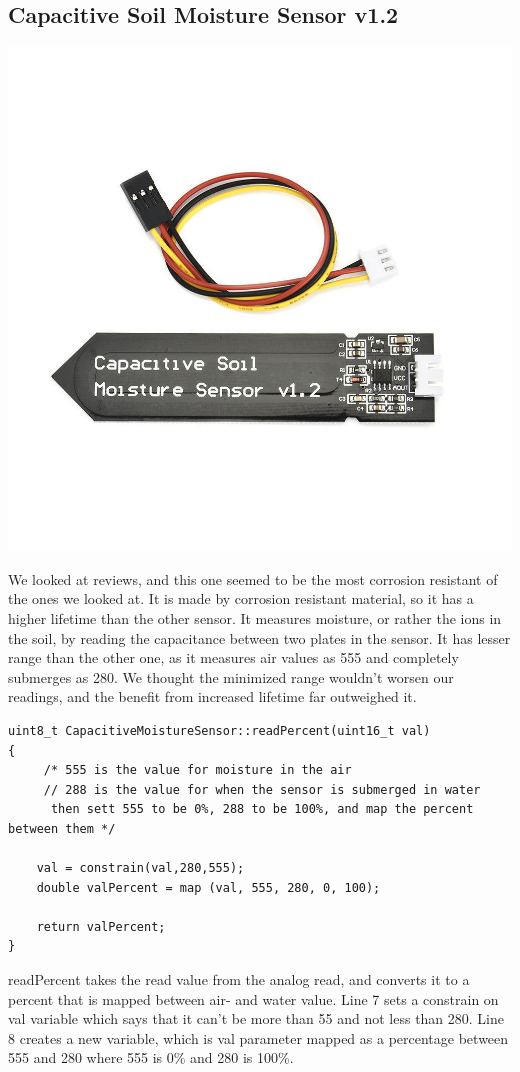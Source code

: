 \documentclass[a4paper,12pt,twoside,openright,titlepage]{book}
\begin{document}
\subsection{Capacitive Soil Moisture Sensor v1.2}
\includegraphics[scale=0.40]{capacitive-sensor}

We looked at reviews, and this one seemed to be the most corrosion resistant of the ones we looked at. It is made by corrosion resistant material, so it has a higher lifetime than the other sensor. It measures moisture, or rather the ions in the soil, by reading the capacitance between two plates in the sensor. It has lesser range than the other one, as it measures air values as 555 and completely submerges as 280. We thought the minimized range wouldn't worsen our readings, and the benefit from increased lifetime far outweighed it.

\begin{lstlisting}[language=Arduino]
uint8_t CapacitiveMoistureSensor::readPercent(uint16_t val)
{
     /* 555 is the value for moisture in the air
	 // 288 is the value for when the sensor is submerged in water
	  then sett 555 to be 0%, 288 to be 100%, and map the percent between them */
	
	val = constrain(val,280,555);
	double valPercent = map (val, 555, 280, 0, 100);

	return valPercent;
}

\end{lstlisting}
readPercent takes the read value from the analog read, and converts it to a percent that is mapped between air- and water value. Line 7 sets a constrain on val variable which says that it can't be more than 55 and not less than 280. Line 8 creates a new variable, which is val parameter mapped as a percentage between 555 and 280 where 555 is 0\% and 280 is 100\%.
\end{document}
